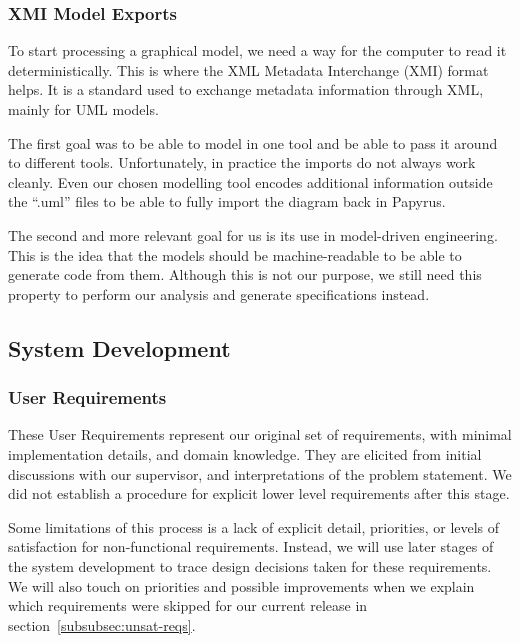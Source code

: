 \subsubsection{XMI Model Exports}
To start processing a graphical model, we need a way for the computer to read it deterministically.
This is where the XML Metadata Interchange (XMI) format helps.
It is a standard used to exchange metadata information through XML, mainly for UML models.

The first goal was to be able to model in one tool and be able to pass it around to different tools.
Unfortunately, in practice the imports do not always work cleanly.
Even our chosen modelling tool encodes additional information outside the ``.uml'' files to be able to fully import the diagram back in Papyrus.

The second and more relevant goal for us is its use in model-driven engineering.
This is the idea that the models should be machine-readable to be able to generate code from them.
Although this is not our purpose, we still need this property to perform our analysis and generate specifications instead.

\subsection{System Development}
\label{subsec:system-development}
\subsubsection{User Requirements}\label{subsubsec:user-reqs}

These User Requirements represent our original set of requirements, with minimal implementation details, and domain knowledge.
They are elicited from initial discussions with our supervisor,
and interpretations of the problem statement.
We did not establish a procedure for explicit lower level requirements after this stage.

Some limitations of this process is a lack of explicit detail, priorities, or levels of satisfaction for non-functional requirements.
Instead, we will use later stages of the system development to trace design decisions taken for these requirements.
We will also touch on priorities and possible improvements when we explain
which requirements were skipped for our current release in section~\ref{subsubsec:unsat-reqs}.

